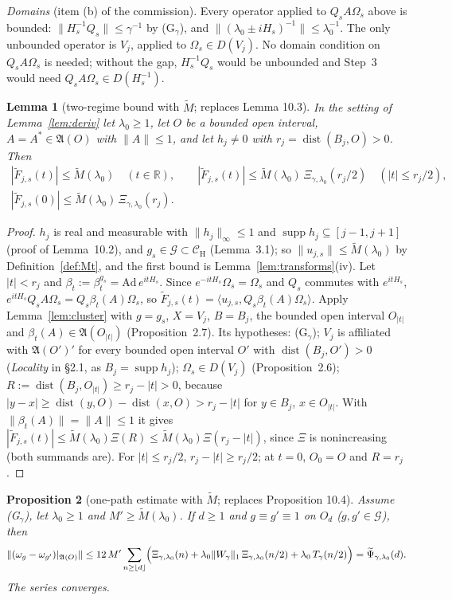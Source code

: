 \documentclass[11pt,a4paper]{article}
\newcommand{\R}{\mathbb{R}}
\newcommand{\A}{\mathfrak{A}}
\newcommand{\G}{\mathcal{G}}
\newcommand{\CH}{\mathcal{C}_{\mathrm H}}
\newcommand{\Om}{\Omega}
\newcommand{\ip}[2]{\langle #1,#2\rangle}
\DeclareMathOperator{\supp}{supp}
\DeclareMathOperator{\dist}{dist}
\newcommand{\Mt}{\widetilde M}                %
\newcommand{\Ft}{\widetilde F}
\newcommand{\Psit}{\widetilde\Psi}
\theoremstyle{plain}
\newtheorem{tlemma}{Lemma}
\newtheorem{tprop}[tlemma]{Proposition}
\theoremstyle{definition}
\begin{document}
\emph{Domains} (item (b) of the commission).  Every operator applied to $Q_sA\Om_s$ above is
bounded: $\|H_s^{-1}Q_s\|\le\gamma^{-1}$ by (G$_\gamma$), and
$\|(\lambda_0\pm iH_s)^{-1}\|\le\lambda_0^{-1}$.  The only unbounded operator is $V_j$, applied
to $\Om_s\in D(V_j)$.  No domain condition on $Q_sA\Om_s$ is needed; without the gap,
$H_s^{-1}Q_s$ would be unbounded and Step~3 would need $Q_sA\Om_s\in D(H_s^{-1})$.

\begin{tlemma}[two-regime bound with $\Mt$; replaces Lemma 10.3]\label{lem:tworegime}
In the setting of Lemma~\ref{lem:deriv} let $\lambda_0\ge1$, let $O$ be a bounded open interval,
$A=A^*\in\A(O)$ with $\|A\|\le1$, and let $h_j\ne0$ with $r_j=\dist(B_j,O)>0$.  Then
\begin{gather*}
 |\Ft_{j,s}(t)|\le\Mt(\lambda_0)\quad(t\in\R),\qquad
 |\Ft_{j,s}(t)|\le\Mt(\lambda_0)\,\Xi_{\gamma,\lambda_0}(r_j/2)\quad(|t|\le r_j/2),\\
 |\Ft_{j,s}(0)|\le\Mt(\lambda_0)\,\Xi_{\gamma,\lambda_0}(r_j) .
\end{gather*}
\end{tlemma}

\begin{proof}
$h_j$ is real and measurable with $\|h_j\|_\infty\le1$ and $\supp h_j\subseteq[j-1,j+1]$ (proof
of Lemma~10.2), and $g_s\in\G\subset\CH$ (Lemma~3.1); so $\|u_{j,s}\|\le\Mt(\lambda_0)$ by
Definition~\ref{def:Mt}, and the first bound is Lemma~\ref{lem:transforms}(iv).  Let $|t|<r_j$
and $\beta_t:=\beta^{g_s}_t=\mathrm{Ad}\,e^{itH_s}$.  Since $e^{-itH_s}\Om_s=\Om_s$ and $Q_s$
commutes with $e^{itH_s}$, $e^{itH_s}Q_sA\Om_s=Q_s\beta_t(A)\Om_s$, so
$\Ft_{j,s}(t)=\ip{u_{j,s}}{Q_s\beta_t(A)\Om_s}$.  Apply Lemma~\ref{lem:cluster} with $g=g_s$,
$X=V_j$, $B=B_j$, the bounded open interval $O_{|t|}$ and $\beta_t(A)\in\A(O_{|t|})$
(Proposition~2.7).  Its hypotheses: (G$_\gamma$); $V_j$ is affiliated with $\A(O')'$ for every
bounded open interval $O'$ with $\dist(B_j,O')>0$ (\emph{Locality} in \S2.1, as
$B_j=\supp h_j$); $\Om_s\in D(V_j)$ (Proposition~2.6); $R:=\dist(B_j,O_{|t|})\ge r_j-|t|>0$,
because $|y-x|\ge\dist(y,O)-\dist(x,O)>r_j-|t|$ for $y\in B_j$, $x\in O_{|t|}$.  With
$\|\beta_t(A)\|=\|A\|\le1$ it gives $|\Ft_{j,s}(t)|\le\Mt(\lambda_0)\Xi(R)\le
\Mt(\lambda_0)\Xi(r_j-|t|)$, since $\Xi$ is nonincreasing (both summands are).  For
$|t|\le r_j/2$, $r_j-|t|\ge r_j/2$; at $t=0$, $O_0=O$ and $R=r_j$.
\end{proof}

\begin{tprop}[one-path estimate with $\Mt$; replaces Proposition 10.4]\label{prop:onepath}
Assume (G$_\gamma$), let $\lambda_0\ge1$ and $M'\ge\Mt(\lambda_0)$.  If $d\ge1$ and
$g\equiv g'\equiv1$ on $O_d$ ($g,g'\in\G$), then
\[
 \|(\omega_g-\omega_{g'})|_{\A(O)}\|\le12\,M'\sum_{n\ge\lfloor d\rfloor}\Bigl(\Xi_{\gamma,\lambda_0}(n)
 +\lambda_0\|W_\gamma\|_1\,\Xi_{\gamma,\lambda_0}(n/2)+\lambda_0\,T_\gamma(n/2)\Bigr)
 =\Psit_{\gamma,\lambda_0}(d) .
\]
The series converges.
\end{tprop}
\end{document}
